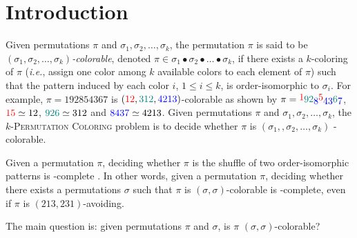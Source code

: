 \section{Introduction}
\label{section:Introduction}

Given permutations $\pi$ and $\sigma_1, \sigma_2, \ldots, \sigma_k$,
the permutation $\pi$ is said to be
\emph{$(\sigma_1, \sigma_2, \ldots, \sigma_k)$-colorable},
denoted $\pi \in \sigma_1 \bullet \sigma_2 \bullet \dots \bullet \sigma_k$,
if there exists a $k$-coloring of $\pi$ (\emph{i.e.}, assign one color
among $k$ available colors to each element of $\pi$) such that the
pattern induced by each color $i$, $1 \leq i \leq k$, is order-isomorphic
to $\sigma_i$.
For example, $\pi = 192854367$ is 
$({\color{red}12}, {\color{teal}312}, {\color{blue}4213})$-colorable
as shown by 
$\pi = 
\raisebox{2pt}{{\color{red}1}}
\raisebox{0pt}{{\color{teal}92}}
\raisebox{-2pt}{{\color{blue}8}}
\raisebox{2pt}{{\color{red}5}}
\raisebox{-2pt}{{\color{blue}43}}
\raisebox{0pt}{{\color{teal}6}}
\raisebox{-2pt}{{\color{blue}7}}$,
${\color{red}15} \simeq 12$,
${\color{teal}926} \simeq 312$ and
${\color{blue}8437} \simeq 4213$.
Given permutations $\pi$ and $\sigma_1, \sigma_2, \ldots, \sigma_k$,
the \textsc{$k$-Permutation Coloring} problem is to decide whether $\pi$
is $(\sigma_1,, \sigma_2, \ldots, \sigma_k)$ -colorable.

Given a permutation $\pi$, deciding whether $\pi$ is the shuffle of 
two order-isomorphic patterns is \NP-complete \cite{DBLP:journals/tcs/GiraudoV18}.
In other words, given a permutation $\pi$, deciding whether 
there exists a permutations $\sigma$ such that $\pi$ is 
$(\sigma, \sigma)$-colorable is \NP-complete,
even if $\pi$ is $(213, 231)$-avoiding.

The main question is: 
given permutations $\pi$ and $\sigma$, is $\pi$ $(\sigma, \sigma)$-colorable?